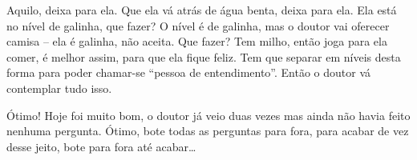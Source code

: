 Aquilo, deixa para ela. Que ela vá atrás de água benta, deixa para
ela. Ela está no nível de galinha, que fazer? O nível é de galinha, mas
o doutor vai oferecer camisa – ela é galinha, não aceita. Que fazer?
Tem milho, então joga para ela comer, é melhor assim, para que ela
fique feliz. Tem que separar em níveis desta forma para poder chamar-se
“pessoa de entendimento”. Então o doutor vá contemplar tudo isso.

Ótimo! Hoje foi muito bom, o doutor já veio duas vezes mas ainda não
havia feito nenhuma pergunta. Ótimo, bote todas as perguntas para fora,
para acabar de vez desse jeito, bote para fora até acabar…
